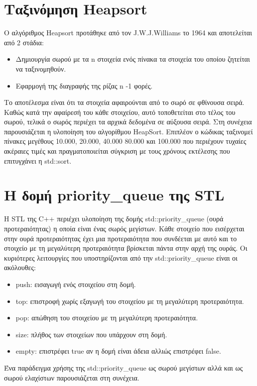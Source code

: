 


\section{Ταξινόμηση Heapsort}
Ο αλγόριθμος Heapsort προτάθηκε από τον J.W.J.Williams το 1964 και αποτελείται από 2 στάδια:
\begin{itemize}[noitemsep]
\item Δημιουργία σωρού με τα n στοιχεία ενός πίνακα τα στοιχεία του οποίου ζητείται να ταξινομηθούν. 
\item Εφαρμογή της διαγραφής της ρίζας n -1 φορές.
\end{itemize}
Το αποτέλεσμα είναι ότι τα στοιχεία αφαιρούνται από το σωρό σε φθίνουσα σειρά. Καθώς κατά την αφαίρεσή του κάθε στοιχείου, αυτό τοποθετείται στο τέλος του σωρού, τελικά ο σωρός περιέχει τα αρχικά δεδομένα σε αύξουσα σειρά. Στη συνέχεια παρουσιάζεται η υλοποίηση του αλγορίθμου HeapSort. Επιπλέον ο κώδικας ταξινομεί πίνακες μεγέθους 10.000, 20.000, 40.000 80.000 και 100.000 που περιέχουν τυχαίες ακέραιες τιμές και πραγματοποιείται σύγκριση με τους χρόνους εκτέλεσης που επιτυγχάνει η std::sort.






\section{Η δομή priority\_queue της STL}
Η STL της C++ περιέχει υλοποίηση της δομής std::priority\_queue (ουρά προτεραιότητας) η οποία είναι ένας σωρός μεγίστων. Κάθε στοιχείο που εισέρχεται  στην ουρά προτεραιότητας έχει μια προτεραιότητα που συνδέεται με αυτό και το στοιχείο με τη μεγαλύτερη προτεραιότητα βρίσκεται πάντα στην αρχή της ουράς. Οι κυριότερες λειτουργίες που υποστηρίζονται από την std::priority\_queue είναι οι ακόλουθες:
\begin{itemize}[noitemsep]
\item push: εισαγωγή ενός στοιχείου στη δομή.
\item top: επιστροφή χωρίς εξαγωγή του στοιχείου με τη μεγαλύτερη προτεραιότητα.
\item pop: απώθηση του στοιχείου με τη μεγαλύτερη προτεραιότητα.
\item size: πλήθος των στοιχείων που υπάρχουν στη δομή.
\item empty: επιστρέφει true αν η δομή είναι άδεια αλλιώς επιστρέφει false.
\end{itemize}
Ένα παράδειγμα χρήσης της std::priority\_queue ως σωρού μεγίστων αλλά και ως σωρού ελαχίστων παρουσιάζεται στη συνέχεια.

